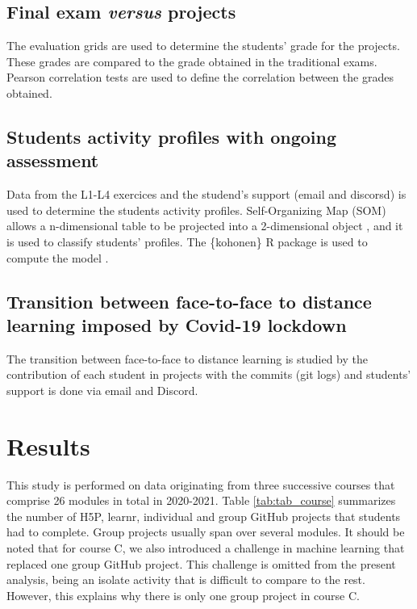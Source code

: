 \documentclass{aims}
\theoremstyle{definition}
\begin{document}
\hypertarget{final-exam-versus-projects}{%
\subsection{\texorpdfstring{Final exam \emph{versus}
projects}{Final exam versus projects}}\label{final-exam-versus-projects}}

The evaluation grids are used to determine the students' grade for the
projects. These grades are compared to the grade obtained in the
traditional exams. Pearson correlation tests are used to define the
correlation between the grades obtained.

\hypertarget{students-activity-profiles-with-ongoing-assessment}{%
\subsection{Students activity profiles with ongoing
assessment}\label{students-activity-profiles-with-ongoing-assessment}}

Data from the L1-L4 exercices and the studend's support (email and
discorsd) is used to determine the students activity profiles.
Self-Organizing Map (SOM) allows a n-dimensional table to be projected
into a 2-dimensional object \cite{Kohonen1995}, and it is used to
classify students' profiles. The \{kohonen\} R package is used to
compute the model \cite{Wehrens2018}.

\hypertarget{transition-between-face-to-face-to-distance-learning-imposed-by-covid-19-lockdown}{%
\subsection{Transition between face-to-face to distance learning imposed
by Covid-19
lockdown}\label{transition-between-face-to-face-to-distance-learning-imposed-by-covid-19-lockdown}}

The transition between face-to-face to distance learning is studied by
the contribution of each student in projects with the commits (git logs)
and students' support is done via email and Discord.

\hypertarget{results}{%
\section{Results}\label{results}}

This study is performed on data originating from three successive
courses that comprise 26 modules in total in 2020-2021. Table
\ref {tab:tab_course} summarizes the number of H5P, learnr, individual
and group GitHub projects that students had to complete. Group projects
usually span over several modules. It should be noted that for course C,
we also introduced a challenge in machine learning that replaced one
group GitHub project. This challenge is omitted from the present
analysis, being an isolate activity that is difficult to compare to the
rest. However, this explains why there is only one group project in
course C.
\end{document}

